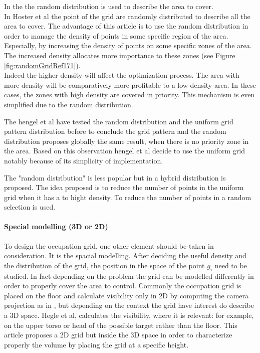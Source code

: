  In the  \cite{83*van2009,171*horster2006} the random distribution is used to describe the area to cover. \\
In Hoster et al \citep{171*horster2006} the point of the grid are randomly distributed to describe all the area to cover. The advantage of this article is to use the random distribution in order to manage the density of points in some specific region of the area. Especially, by increasing the density of points on some specific zones of the area. The increased density allocates more importance to these zones (see Figure \ref{fig:randomGridRef171}).\\
Indeed the higher density will affect the optimization process. The area with more density will be comparatively more profitable to a low density area. In these cases, the zones with high density are covered in priority. This mechanism is even simplified due to the random distribution.

The hengel et al \cite{83*van2009} have tested the random distribution and the uniform grid pattern distribution before to conclude the grid pattern and the random distribution proposes globally the same result, when there is no priority zone in the area. Based on this observation hengel et al \cite{83*van2009} decide to use the uniform grid notably because of its simplicity of implementation.

The "random distribution" is less popular but in \cite{22*zhao2008} a hybrid distribution is proposed. The idea proposed is to reduce the number of points in the uniform grid when it has a to hight density. To reduce the number of points in a random  selection is used. 



\paragraph*{ Special modelling (3D  or 2D)}
To design the occupation grid, one other element should be taken in consideration. It is the spacial modelling. After deciding the useful density and the distribution of the grid, the position in the space of the point $g_i$ need to be studied.  
In fact depending on the problem the grid can be modelled differently in order to properly cover the area to control. Commonly the occupation grid is placed on the floor and calculate visibility only in 2D  by computing the  camera projection as in  \citep{164*valente2013,150*chakrabarty2002,8*zhou2011,170*yabuta2008,171*horster2006,22*zhao2008}, but depending on the context the grid have interest do describe a 3D space.  
Hegle et al\cite{83*van2009}, calculates the visibility, where it is relevant: for example, on the upper torso or head of the possible target rather than the floor. This article  proposes a 2D grid but inside the 3D space in order to  characterize properly the volume by placing the grid at a specific height.  


